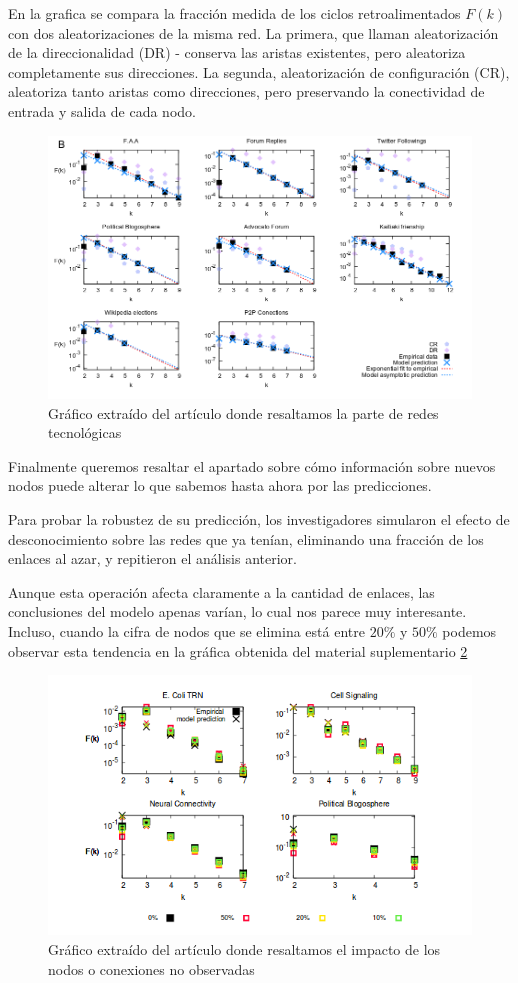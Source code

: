 \documentclass[1p]{elsarticle}
\begin{document}
 En la grafica se compara la fracción medida de los ciclos retroalimentados $F(k)$ con dos aleatorizaciones de la misma red. La primera, que llaman aleatorización de la direccionalidad (DR) - conserva las aristas existentes, pero aleatoriza completamente sus direcciones. La segunda, aleatorización de configuración (CR), aleatoriza tanto aristas como direcciones, pero preservando la conectividad de entrada y salida de cada nodo.
\begin{figure}
	\centering
	\includegraphics[width=15cm]{graf_2.png}
	\caption{Gráfico extraído del artículo donde resaltamos la parte de redes tecnológicas}
	\label{h1}
\end{figure}

Finalmente queremos resaltar el apartado sobre cómo información sobre nuevos nodos puede alterar lo que sabemos hasta ahora por las predicciones.

 Para probar la robustez
de su predicción, los investigadores simularon el efecto de desconocimiento sobre las redes que ya tenían,
eliminando una fracción de los enlaces al azar, y repitieron el análisis anterior. 

Aunque esta operación afecta claramente a la cantidad de enlaces, las conclusiones del modelo apenas varían, lo cual nos parece muy interesante. Incluso, cuando la cifra de nodos que se elimina está entre $20\%$ y $50\%$ podemos observar esta tendencia en la gráfica obtenida del material suplementario \ref{h4}
\begin{figure}
	\centering
	\includegraphics[width=15cm]{graf_3.png}
	\caption{Gráfico extraído del artículo donde resaltamos el impacto de los nodos o conexiones no observadas}
	\label{h4}
\end{figure}
\end{document}
